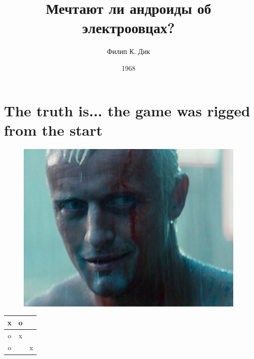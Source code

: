 \documentclass[a4paper,12pt]{article}
\title{Мечтают ли андроиды об электроовцах?}
\author{Филип К. Дик}
\date{1968}
\begin{document}
\maketitle %

\section*{The truth is... the game was rigged from the start} %

\begin{figure}[h] %
  \centering
  \includegraphics[width=0.8\linewidth]{tears-in-rain.jpg}
\end{figure}

\begin{table}[h] %
  \centering
  \begin{tabular}{|c|c|c|}
  \hline
  x & o &  \\ \hline
  o & x &  \\ \hline
  o &  & x \\ \hline
  \end{tabular}
\end{table}
\end{document}

